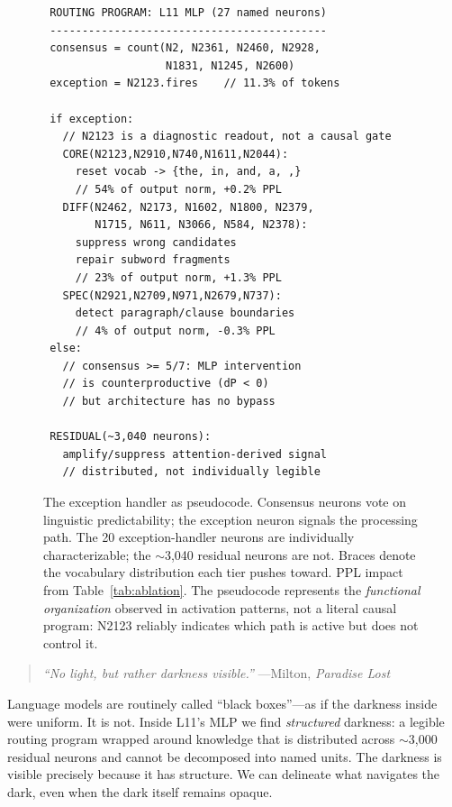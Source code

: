 \documentclass{article}
\begin{document}
\begin{figure}[t]
\centering
\small
\begin{verbatim}
 ROUTING PROGRAM: L11 MLP (27 named neurons)
 -------------------------------------------
 consensus = count(N2, N2361, N2460, N2928,
                   N1831, N1245, N2600)
 exception = N2123.fires    // 11.3% of tokens

 if exception:
   // N2123 is a diagnostic readout, not a causal gate
   CORE(N2123,N2910,N740,N1611,N2044):
     reset vocab -> {the, in, and, a, ,}
     // 54% of output norm, +0.2% PPL
   DIFF(N2462, N2173, N1602, N1800, N2379,
        N1715, N611, N3066, N584, N2378):
     suppress wrong candidates
     repair subword fragments
     // 23% of output norm, +1.3% PPL
   SPEC(N2921,N2709,N971,N2679,N737):
     detect paragraph/clause boundaries
     // 4% of output norm, -0.3% PPL
 else:
   // consensus >= 5/7: MLP intervention
   // is counterproductive (dP < 0)
   // but architecture has no bypass

 RESIDUAL(~3,040 neurons):
   amplify/suppress attention-derived signal
   // distributed, not individually legible
\end{verbatim}
\caption{The exception handler as pseudocode. Consensus neurons vote
on linguistic predictability; the exception neuron signals the processing
path. The 20 exception-handler neurons are individually characterizable;
the $\sim$3,040 residual neurons are not. Braces denote the vocabulary
distribution each tier pushes toward. PPL impact from Table~\ref{tab:ablation}.
The pseudocode represents the \emph{functional organization} observed in
activation patterns, not a literal causal program: N2123 reliably indicates
which path is active but does not control it.}
\label{fig:pseudocode}
\end{figure}

\begin{quote}
\emph{``No light, but rather darkness visible.''}
\hfill ---Milton, \emph{Paradise Lost}
\end{quote}

\noindent Language models are routinely called ``black boxes''---as if the darkness
inside were uniform.
It is not.
Inside L11's MLP we find \emph{structured} darkness: a legible routing
program wrapped around knowledge that is distributed across $\sim$3{,}000
residual neurons and cannot be decomposed into named units.
The darkness is visible precisely because it has structure.
We can delineate what navigates the dark, even when the dark itself
remains opaque.
\end{document}
